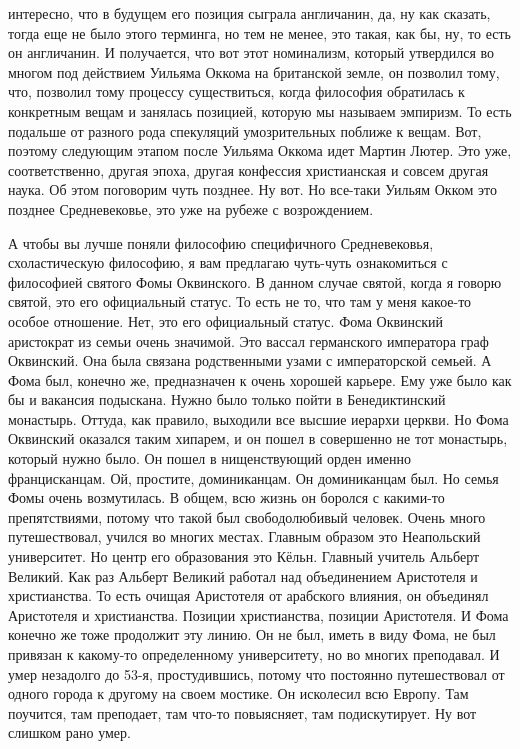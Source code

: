 интересно, что в будущем его позиция сыграла англичанин, да, ну как сказать,
тогда еще не было этого терминга, но тем не менее, это такая, как бы, ну, то
есть он англичанин. И получается, что вот этот номинализм, который утвердился во
многом под действием Уильяма Оккома на британской земле, он позволил тому, что,
позволил тому процессу существиться, когда философия обратилась к конкретным
вещам и занялась позицией, которую мы называем эмпиризм. То есть подальше от
разного рода спекуляций умозрительных поближе к вещам. Вот, поэтому следующим
этапом после Уильяма Оккома идет Мартин Лютер. Это уже, соответственно, другая
эпоха, другая конфессия христианская и совсем другая наука. Об этом поговорим
чуть позднее. Ну вот. Но все-таки Уильям Окком это позднее Средневековье, это
уже на рубеже с возрождением. 

А чтобы вы лучше поняли философию специфичного
Средневековья, схоластическую философию, я вам предлагаю чуть-чуть ознакомиться
с философией святого Фомы Оквинского. В данном случае святой, когда я говорю
святой, это его официальный статус. То есть не то, что там у меня какое-то
особое отношение. Нет, это его официальный статус. Фома Оквинский аристократ из
семьи очень значимой. Это вассал германского императора граф Оквинский. Она была
связана родственными узами с императорской семьей. А Фома был, конечно же,
предназначен к очень хорошей карьере. Ему уже было как бы и вакансия подыскана.
Нужно было только пойти в Бенедиктинский монастырь. Оттуда, как правило,
выходили все высшие иерархи церкви. Но Фома Оквинский оказался таким хипарем, и
он пошел в совершенно не тот монастырь, который нужно было. Он пошел в
нищенствующий орден именно францисканцам. Ой, простите, доминиканцам. Он
доминиканцам был. Но семья Фомы очень возмутилась. В общем, всю жизнь он боролся
с какими-то препятствиями, потому что такой был свободолюбивый человек. Очень
много путешествовал, учился во многих местах. Главным образом это Неапольский
университет. Но центр его образования это Кёльн. Главный учитель Альберт
Великий. Как раз Альберт Великий работал над объединением Аристотеля и
христианства. То есть очищая Аристотеля от арабского влияния, он объединял
Аристотеля и христианства. Позиции христианства, позиции Аристотеля. И Фома
конечно же тоже продолжит эту линию. Он не был, иметь в виду Фома, не был
привязан к какому-то определенному университету, но во многих преподавал. И умер
незадолго до 53-я, простудившись, потому что постоянно путешествовал от одного
города к другому на своем мостике. Он исколесил всю Европу. Там поучится, там
преподает, там что-то повыясняет, там подискутирует. Ну вот слишком рано умер.
